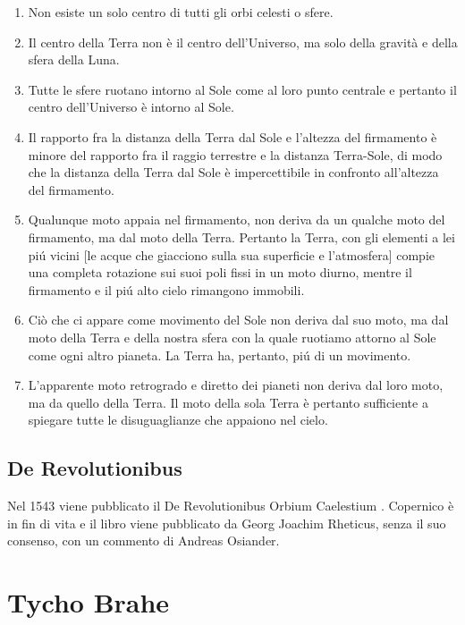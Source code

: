 \documentclass[a4paper]{scrartcl}
\begin{document}
\begin{enumerate}
	\item Non esiste un solo centro di tutti gli orbi celesti o sfere.
	
	\item Il centro della Terra non è il centro dell'Universo, ma solo della gravità e della sfera della Luna.
	
	\item Tutte le sfere ruotano intorno al Sole come al loro punto centrale e pertanto il centro dell'Universo è intorno al Sole.
	
	\item Il rapporto fra la distanza della Terra dal Sole e l'altezza del firmamento è minore del rapporto fra il raggio terrestre e la distanza Terra-Sole, di modo che la distanza della Terra dal Sole è impercettibile in confronto all'altezza del firmamento.
	
	\item Qualunque moto appaia nel firmamento, non deriva da un qualche moto del firmamento, ma dal moto della Terra. Pertanto la Terra, con gli elementi a lei piú vicini [le acque che giacciono sulla sua superficie e l'atmosfera] compie una completa rotazione sui suoi poli fissi in un moto diurno, mentre il firmamento e il piú alto cielo rimangono immobili.
	
	\item Ciò che ci appare come movimento del Sole non deriva dal suo moto, ma dal moto della Terra e della nostra sfera con la quale ruotiamo attorno al Sole come ogni altro pianeta. La Terra ha, pertanto, piú di un movimento.
	
	\item L'apparente moto retrogrado e diretto dei pianeti non deriva dal loro moto, ma da quello della Terra. Il moto della sola Terra è pertanto sufficiente a spiegare tutte le disuguaglianze che appaiono nel cielo.
	
\end{enumerate}

\subsection{De Revolutionibus}
Nel 1543 viene pubblicato il De Revolutionibus Orbium Caelestium \autocite{copernico:derevolutionibus}. Copernico è in fin di vita e il libro viene pubblicato da Georg Joachim Rheticus, senza il suo consenso, con un commento di Andreas Osiander.

\section{Tycho Brahe}
\end{document}
